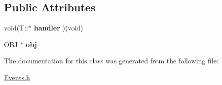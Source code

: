 \subsection*{Public Attributes}
\begin{DoxyCompactItemize}
\item 
\hypertarget{class_event0_a9f5c4b04f0f887ef7a2df146e10e9403}{void(T\-::$\ast$ {\bfseries handler} )(void)}\label{class_event0_a9f5c4b04f0f887ef7a2df146e10e9403}

\item 
\hypertarget{class_event0_ab37236e93d14993e36a8913ae2dbaf31}{O\-B\-J $\ast$ {\bfseries obj}}\label{class_event0_ab37236e93d14993e36a8913ae2dbaf31}

\end{DoxyCompactItemize}


The documentation for this class was generated from the following file\-:\begin{DoxyCompactItemize}
\item 
\hyperlink{_events_8h}{Events.\-h}\end{DoxyCompactItemize}
